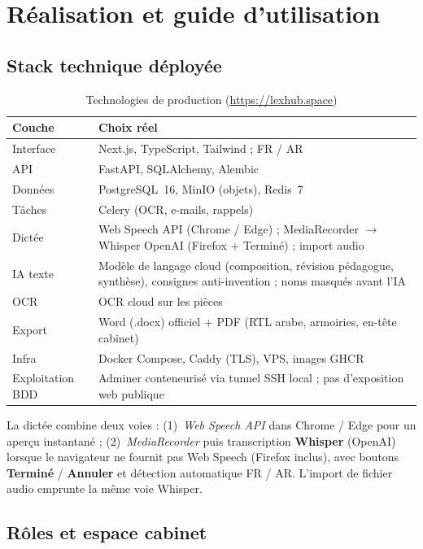 \chapter{Réalisation et guide d'utilisation}
\label{ch:realisation}

\section{Stack technique déployée}

\begin{table}[H]
\centering
\caption{Technologies de production (\url{https://lexhub.space})}
\label{tab:stack}
\begin{tabular}{@{}ll@{}}
\toprule
\textbf{Couche} & \textbf{Choix réel} \\
\midrule
Interface & Next.js, TypeScript, Tailwind ; FR / AR \\
API & FastAPI, SQLAlchemy, Alembic \\
Données & PostgreSQL~16, MinIO (objets), Redis~7 \\
Tâches & Celery (OCR, e-mails, rappels) \\
Dictée & Web Speech API (Chrome / Edge) ; MediaRecorder $\rightarrow$ Whisper OpenAI (Firefox + Terminé) ; import audio \\
IA texte & Modèle de langage cloud (composition, révision pédagogue, synthèse), consignes anti-invention ; noms masqués avant l'IA \\
OCR & OCR cloud sur les pièces \\
Export & Word (.docx) officiel + PDF (RTL arabe, armoiries, en-tête cabinet) \\
Infra & Docker Compose, Caddy (TLS), VPS, images GHCR \\
Exploitation BDD & Adminer conteneurisé via tunnel SSH local ; pas d'exposition web publique \\
\bottomrule
\end{tabular}
\end{table}

La dictée combine deux voies : (1)~\textit{Web Speech API} dans Chrome / Edge pour un aperçu instantané ; (2)~\textit{MediaRecorder} puis transcription \textbf{Whisper} (OpenAI) lorsque le navigateur ne fournit pas Web Speech (Firefox inclus), avec boutons \textbf{Terminé} / \textbf{Annuler} et détection automatique FR / AR. L'import de fichier audio emprunte la même voie Whisper.

\section{Rôles et espace cabinet}

